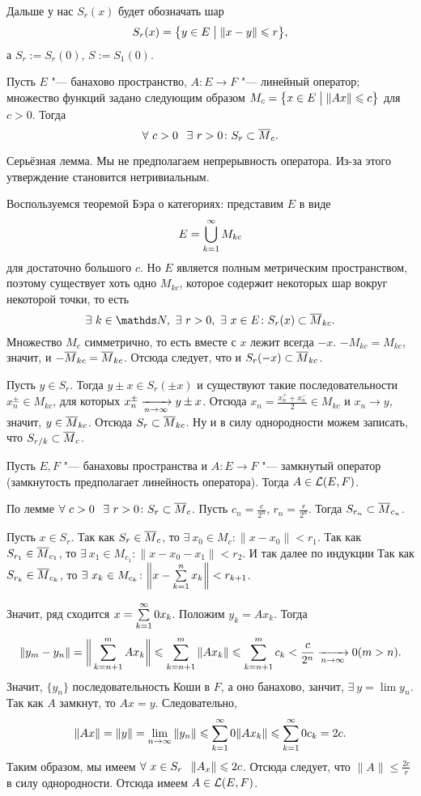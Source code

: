 Дальше у нас $S_r(x)$ будет обозначать шар
\[
  S_r(x) = \big\{y\in E\bigm| \|x-y\|\le r\big\},
\]
а $S_r:=S_r(0)$, $S:=S_1(0)$.

\begin{Lem}
 Пусть $E$ "--- банахово пространство, $A\colon E\to F$ "--- линейный оператор; множество функций задано следующим образом $M_c = \big\{x\in E\bigm|\|Ax\|\le c\big\}$ для $c>0$. Тогда
\[
  \forall\ c>0\pau \exists\ r>0\colon S_r\subset \ol M_c.
\]
\end{Lem}
Серьёзная лемма. Мы не предполагаем непрерывность оператора. Из-за этого утверждение становится нетривиальным.
\begin{Proof}
  Воспользуемся теоремой Бэра о категориях: представим $E$ в виде
\[
  E = \uN k1 M_{kc}
\]
для достаточно большого $c$. Но $E$ является полным метрическим пространством, поэтому существует хоть одно $M_{kc}$, которое содержит некоторых шар вокруг некоторой точки, то есть
\[
  \exists\ k\in\N,\ \exists\ r>0,\ \exists\ x\in E\colon S_r(x)\subset \ol M_{kc}.
\]
Множество $M_c$ симметрично, то есть вместе с $x$ лежит всегда $-x$. $-M_{kc}=M_{kc}$, значит, и $-\ol M_{kc} = \ol M_{kc}$. Отсюда следует, что и $S_r(-x)\subset \ol M_{kc}$.

Пусть $y\in S_r$. Тогда $y\pm x\in S_r(\pm x)$ и существуют такие последовательности $x_n^\pm\in M_{kc}$, для которых $x_n^\pm\te y\pm x$. Отсюда $x_n = \frac{x_n^+ + x_n^-}{2}\in M_{kc}$ и $x_n\to y$, значит, $y\in \ol M_{kc}$. Отсюда $S_r\subset \ol M_{kc}$. Ну и в силу однородности можем записать, что $S_{r/k}\subset \ol M_c$.
\end{Proof}
\begin{The}
  Пусть $E,F$ "--- банаховы пространства и $A\colon E\to F$ "--- замкнутый оператор (замкнутость предполагает линейность оператора). Тогда $A\in\L(E,F)$. 
\end{The}
\begin{Proof}
  По лемме $\forall\ c>0\pau \exists\ r>0\colon S_r\subset \ol M_c$. Пусть $c_n = \frac{c}{2^n}$, $r_n=\frac{r}{2^n}$. Тогда $S_{r_n}\subset\ol M_{c_n}$.

Пусть $x\in S_r$. 
Так как $S_r\in\ol{M}_c$, то $\exists\ x_0\in M_c\colon \|x-x_0\|<r_1$.
Так как $S_{r_1}\in\ol{M}_{c_1}$, то $\exists\ x_1\in M_{c_1}\colon \|x-x_0-x_1\|<r_2$. И так далее по индукции
Так как $S_{r_k}\in\ol{M}_{c_k}$, то $\exists\ x_k\in M_{c_k}\colon \bigg\|x-\RY k1nx_k\bigg\|<r_{k+1}$.

Значит, ряд сходится $x = \rY k0x_k$. Положим $y_k = Ax_k$. Тогда
\[
  \|y_m-y_n\| = \bigg\|\RY k{n+1}mAx_k\bigg\|\le \RY k{n+1}m\|Ax_k\|\le
  \RY k{n+1}mc_k<\frac{c}{2^n}\te0 (m>n).
\]
Значит, $\{y_n\}$ последовательность Коши в $F$, а оно банахово, занчит, $\exists\ y = \lim y_n$. Так как $A$ замкнут, то $Ax = y$.
Следовательно, 
\[
\|Ax\| = \|y\| = \yo n\infty\|y_n\|\le \rY k0\|Ax_k\|\le
  \rY k0 c_k = 2c.
 \]
Таким образом, мы имеем $\forall\ x\in S_r\pau \|A_x\|\le 2c$. Отсюда следует, что $\|A\|\le\frac{2c}{r}$ в силу однородности. Отсюда имеем $A\in \L(E,F)$.
\end{Proof}

